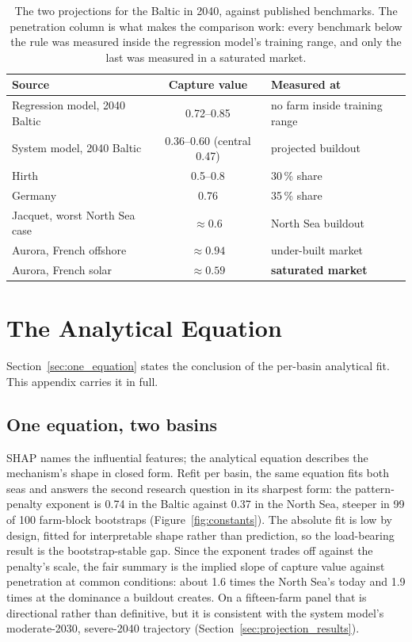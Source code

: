 \begin{table}[!htb]
\centering\small
\caption{The two projections for the Baltic in 2040, against published
benchmarks. The penetration column is what makes the comparison work: every
benchmark below the rule was measured inside the regression model's training
range, and only the last was measured in a saturated market.}
\label{tab:external}
\begin{tabular}{l c l}
\toprule
\textbf{Source} & \textbf{Capture value} & \textbf{Measured at} \\
\midrule
Regression model, 2040 Baltic & 0.72--0.85 & no farm inside training range \\
System model, 2040 Baltic & 0.36--0.60 (central 0.47) & projected buildout \\
\midrule
Hirth \cite{Hirth2013} & 0.5--0.8 & 30\,\% share \\
Germany \cite{Stiewe2025, Ember2025} & 0.76 & 35\,\% share \\
Jacquet, worst North Sea case \cite{Jacquet2024} & $\approx 0.6$ & North Sea buildout \\
Aurora, French offshore \cite{Aurora2025_France} & $\approx 0.94$ & under-built market \\
\midrule
Aurora, French solar \cite{Aurora2025_France} & $\approx 0.59$ & \textbf{saturated market} \\
\bottomrule
\end{tabular}
\end{table}
\FloatBarrier



\section{The Analytical Equation}\label{app:analytical}

Section~\ref{sec:one_equation} states the conclusion of the per-basin
analytical fit. This appendix carries it in full.

\subsection{One equation, two basins}

SHAP names the influential features; the analytical equation describes the
mechanism's shape in closed form. Refit per basin, the same equation fits both
seas and answers the second research question in its sharpest form: the
pattern-penalty exponent is 0.74 in
the Baltic against 0.37 in the North Sea, steeper in 99 of 100 farm-block
bootstraps (Figure~\ref{fig:constants}). The absolute fit is low by design,
fitted for interpretable shape rather than prediction, so the load-bearing
result is the bootstrap-stable gap. Since the exponent trades off against the
penalty's scale, the fair summary is the implied slope of capture value against
penetration at common conditions: about 1.6 times the North Sea's today and 1.9
times at the dominance a buildout creates. On a fifteen-farm panel that is
directional rather than definitive, but it is consistent with the system model's
moderate-2030, severe-2040 trajectory
(Section~\ref{sec:projection_results}).


